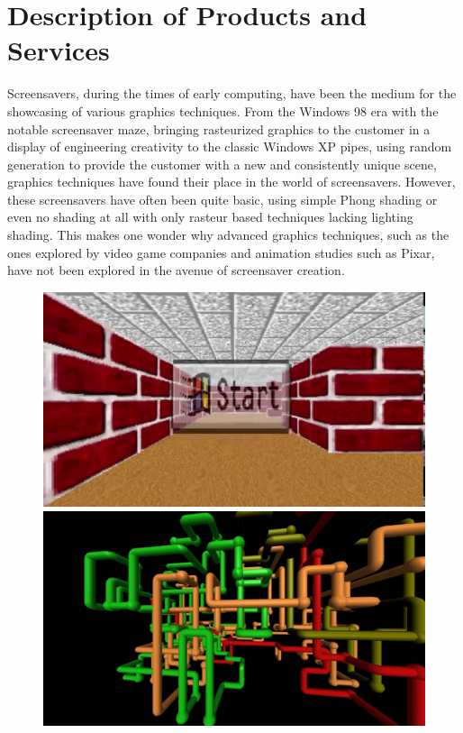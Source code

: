 \documentclass[10pt, openany]{book}
\begin{document}
\section{Description of Products and Services}

Screensavers, during the times of early computing, have been the medium for the showcasing of various graphics techniques. From the Windows 98 era with the notable screensaver maze, bringing rasteurized graphics to the customer in a display of engineering creativity to the classic Windows XP pipes, using random generation to provide the customer with a new and consistently unique scene, graphics techniques have found their place in the world of screensavers. However, these screensavers have often been quite basic, using simple Phong shading or even no shading at all with only rasteur based techniques lacking lighting shading. This makes one wonder why advanced graphics techniques, such as the ones explored by video game companies and animation studies such as Pixar, have not been explored in the avenue of screensaver creation. 

\begin{figure}[H]
\centering
\begin{minipage}{.5\textwidth}
  \centering
  \includegraphics[width=.6\linewidth]{maze}
\end{minipage}%
\begin{minipage}{.5\textwidth}
  \centering
  \includegraphics[width=.6\linewidth]{pipes}
\end{minipage}
\end{figure}	
\end{document}

